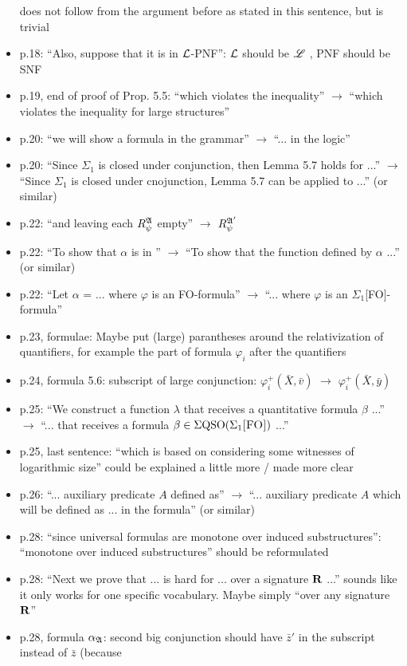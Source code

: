 \begin{itemize}
does not follow from the argument before as stated in this sentence, but is trivial
\item p.18: ``Also, suppose that it is in $\mathcal{L}$-PNF'': $\mathcal{L}$ should be $\mathscr{L}$ , PNF should be SNF
\item p.19, end of proof of Prop. 5.5: ``which violates the inequality'' $\to$ ``which violates the inequality
for large structures''
\item p.20: ``we will show a formula in the grammar'' $\to$ ``... in the logic''
\item p.20: ``Since $\Sigma_1$ is closed under conjunction, then Lemma 5.7 holds for ...'' $\to$ ``Since $\Sigma_1$ is
closed under cnojunction, Lemma 5.7 can be applied to ...'' (or similar)
\item p.22: ``and leaving each $R_{\psi}^{\mathfrak{A}}$ empty'' $\to$ $R_{\psi}^{\mathfrak{A}'}$
\item p.22: ``To show that $\alpha$ is in \totp'' $\to$ ``To show that the function defined by $\alpha$ ...'' (or similar)
\item p.22: ``Let $\alpha$ = ... where $\varphi$ is an FO-formula'' $\to$ ``... where $\varphi$ is an $\Sigma_1$[FO]-formula''
\item p.23, formulae: Maybe put (large) parantheses around the relativization of quantifiers, for
example the part of formula $\varphi_i$ after the quantifiers
\item p.24, formula 5.6: subscript of large conjunction: $\varphi_i^{+}(\bar{X},\bar{v})$ $\to$ $\varphi_i^{+}(\bar{X},\bar{y})$
\item p.25: ``We construct a function $\lambda$ that receives a quantitative formula $\beta$ ...'' $\to$ ``... that receives
a formula $\beta \in \Sigma{\rm QSO}(\Sigma_{1}\textsc{[FO]})$ ...''
\item p.25, last sentence: ``which is based on considering some witnesses of logarithmic size'' could
be explained a little more / made more clear
\item p.26: ``... auxiliary predicate $A$ defined as'' $\to$ ``... auxiliary predicate $A$ which will be defined
as ... in the formula'' (or similar)
\item p.28: ``since universal formulas are monotone over induced substructures'': ``monotone over
induced substructures'' should be reformulated
\item p.28: ``Next we prove that ... is hard for ... over a signature $\mathbf{R}$ ...'' sounds like it only works
for one specific vocabulary. Maybe simply ``over any signature $\mathbf{R}$''
\item p.28, formula $\alpha_{\mathfrak{A}}$: second big conjunction should have $\bar{z}'$ in the subscript instead of $\bar{z}$ (because

\end{itemize}
